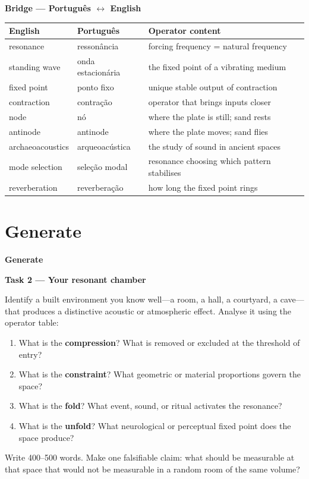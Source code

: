 \documentclass[11pt, twoside, openright]{book}
\theoremstyle{plain}
\theoremstyle{definition}
\newenvironment{bridgebox}{%
  \begin{mdframed}[backgroundcolor=BridgeBox,linecolor=green!50!black,linewidth=0.5pt,innertopmargin=6pt,innerbottommargin=6pt]
  \noindent\textbf{Bridge --- Portugu\^{e}s $\leftrightarrow$ English}\par\medskip}{\end{mdframed}}
\newenvironment{generatebox}{%
  \begin{mdframed}[backgroundcolor=GenerateBox,linecolor=red!50!black,linewidth=0.5pt,innertopmargin=6pt,innerbottommargin=6pt]
  \noindent\textbf{Generate}\par\medskip}{\end{mdframed}}
\begin{document}
\begin{bridgebox}
\begin{tabularx}{\textwidth}{@{}LLL@{}}
\toprule
\textbf{English} & \textbf{Portugu\^{e}s} & \textbf{Operator content} \\
\midrule
resonance       & ressonância       & forcing frequency = natural frequency \\
standing wave   & onda estacionária & the fixed point of a vibrating medium \\
fixed point     & ponto fixo        & unique stable output of contraction \\
contraction     & contração         & operator that brings inputs closer \\
node            & nó                & where the plate is still; sand rests \\
antinode        & antinode          & where the plate moves; sand flies \\
archaeoacoustics& arqueoacústica    & the study of sound in ancient spaces \\
mode selection  & seleção modal     & resonance choosing which pattern stabilises \\
reverberation   & reverberação      & how long the fixed point rings \\
\bottomrule
\end{tabularx}
\end{bridgebox}

\section{Generate}

\begin{generatebox}
\textbf{Task 2 --- Your resonant chamber}

Identify a built environment you know well---a room, a hall, a
courtyard, a cave---that produces a distinctive acoustic or atmospheric
effect. Analyse it using the operator table:
\begin{enumerate}[label=\arabic*.]
  \item What is the \textbf{compression}? What is removed or excluded
    at the threshold of entry?
  \item What is the \textbf{constraint}? What geometric or material
    proportions govern the space?
  \item What is the \textbf{fold}? What event, sound, or ritual
    activates the resonance?
  \item What is the \textbf{unfold}? What neurological or perceptual
    fixed point does the space produce?
\end{enumerate}

Write 400--500 words. Make one falsifiable claim: what should be
measurable at that space that would not be measurable in a random
room of the same volume?
\end{generatebox}
\end{document}
